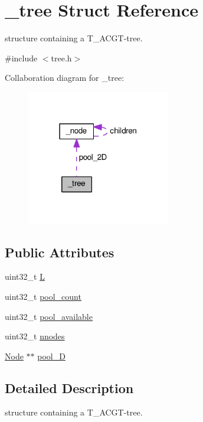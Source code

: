 \hypertarget{struct__tree}{\section{\+\_\+tree Struct Reference}
\label{struct__tree}
}


structure containing a T\+\_\+\+A\+C\+G\+T-\/tree.  




{\ttfamily \#include $<$tree.\+h$>$}



Collaboration diagram for \+\_\+tree\+:\nopagebreak
\begin{figure}[H]
\begin{center}
\leavevmode
\includegraphics[width=178pt]{struct__tree__coll__graph}
\end{center}
\end{figure}
\subsection*{Public Attributes}
\begin{DoxyCompactItemize}
\item 
uint32\+\_\+t \hyperlink{struct__tree_a36ca6c909dd7c119452da0cb49e2c829}{L}
\item 
uint32\+\_\+t \hyperlink{struct__tree_aa90c2b558fc833fc22bcd6617689a41f}{pool\+\_\+count}
\item 
uint32\+\_\+t \hyperlink{struct__tree_afd3769cd9db40fa460d35a0033fb7d02}{pool\+\_\+available}
\item 
uint32\+\_\+t \hyperlink{struct__tree_abffdcd9dcf0df92df4b5444fb74cc523}{nnodes}
\item 
\hyperlink{tree_8h_a6390a1d02010dee1843fa2b1263308c1}{Node} $\ast$$\ast$ \hyperlink{struct__tree_a2783a2aaf32fc3b3c9de8b9fbb14de58}{pool\+\_\+D}
\end{DoxyCompactItemize}


\subsection{Detailed Description}
structure containing a T\+\_\+\+A\+C\+G\+T-\/tree. 


